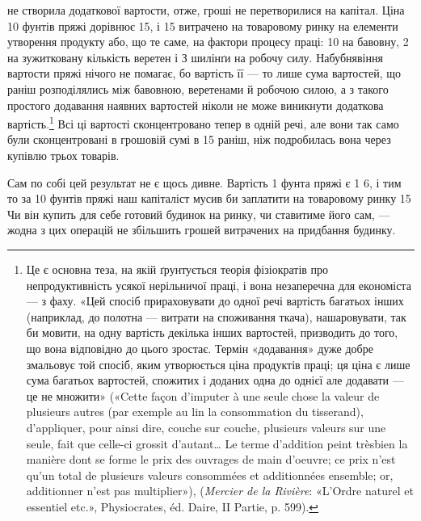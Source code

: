 \parcont{}  %
не створила додаткової вартости, отже, гроші не перетворилися
на капітал. Ціна 10 фунтів пряжі дорівнює 15, і 15
витрачено на товаровому ринку на елементи утворення
продукту або, що те саме, на фактори процесу праці: 10
на бавовну, 2 на зужитковану кількість веретен і
З шилінґи на робочу силу. Набубнявіння вартости пряжі нічого
не помагає, бо вартість її — то лише сума вартостей, що раніш
розподілялись між бавовною, веретенами й робочою силою, а з
такого простого додавання наявних вартостей ніколи не може
виникнути додаткова вартість.\footnote{
Це є основна теза, на якій ґрунтується теорія фізіократів про
непродуктивність усякої нерільничої праці, і вона незаперечна для економіста
— з фаху. «Цей спосіб прираховувати до одної речі вартість багатьох
інших (наприклад, до полотна — витрати на споживання ткача), нашаровувати,
так би мовити, на одну вартість декілька інших вартостей, призводить
до того, що вона відповідно до цього зростає. Термін «додавання» дуже
добре змальовує той спосіб, яким утворюється ціна продуктів праці; ця
ціна є лише сума багатьох вартостей, спожитих і доданих одна до однієї
але додавати — це не множити» («Cette façon d’imputer à une seule chose
la valeur de plusieurs autres (par exemple au lin la consommation du tisserand),
d’appliquer, pour ainsi dire, couche sur couche, plusieurs valeurs
sur une seule, fait que celle-ci grossit d’autant\dots{} Le terme d’addition peint trèsbien
la manière dont se forme le prix des ouvrages de main d’oeuvre; ce prix
n’est qu’un total de plusieurs valeurs consommées et additionnées ensemble;
or, additionner n’est pas multiplier»), (\emph{Mercier de la Rivière}: «L’Ordre naturel
et essentiel etc.», Physiocrates, éd. Daire, II Partie, p. 599).
} Всі ці вартості сконцентровано
тепер в одній речі, але вони так само були сконцентровані в грошовій
сумі в 15 раніш, ніж подробилась вона через
купівлю трьох товарів.

Сам по собі цей результат не є щось дивне. Вартість 1 фунта
пряжі є 1 6, і тим то за 10 фунтів пряжі наш капіталіст
мусив би заплатити на товаровому ринку 15
Чи він купить для себе готовий будинок на ринку, чи ставитиме
його сам, — жодна з цих операцій не збільшить грошей витрачених
на придбання будинку.

